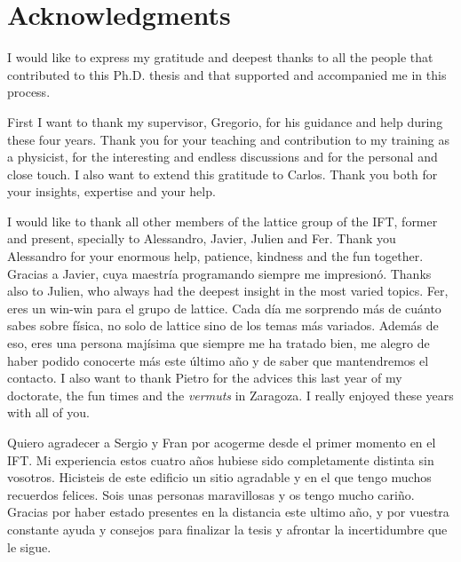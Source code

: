 
\bigskip

\begingroup
\let\clearpage\relax
\let\cleardoublepage\relax
\let\cleardoublepage\relax
\chapter*{Acknowledgments}

I would like to express my gratitude and deepest thanks to all the people that contributed to this Ph.D. thesis and that supported and accompanied me in this process.

First I want to thank my supervisor, Gregorio, for his guidance and help during these four years. Thank you for your teaching and contribution to my training as a physicist, for the interesting and endless discussions and for the personal and close touch. I also want to extend this gratitude to Carlos. Thank you both for your insights, expertise and your help.

I would like to thank all other members of the lattice group of the IFT, former and present, specially to Alessandro, Javier, Julien and Fer. Thank you Alessandro for your enormous help, patience, kindness and the fun together. Gracias a Javier, cuya maestría programando siempre me impresionó. Thanks also to Julien, who always had the deepest insight in the most varied topics. Fer, eres un win-win para el grupo de lattice. Cada día me sorprendo más de cuánto sabes sobre física, no solo de lattice sino de los temas más variados. Además de eso, eres una persona majísima que siempre me ha tratado bien, me alegro de haber podido conocerte más este último año y de saber que mantendremos el contacto. I also want to thank Pietro for the advices this last year of my doctorate, the fun times and the \textit{vermuts} in Zaragoza. I really enjoyed these years with all of you.

Quiero agradecer a Sergio y Fran por acogerme desde el primer momento en el IFT. Mi experiencia estos cuatro años hubiese sido completamente distinta sin vosotros. Hicisteis de este edificio un sitio agradable y en el que tengo muchos recuerdos felices. Sois unas personas maravillosas y os tengo mucho cariño. Gracias por haber estado presentes en la distancia este ultimo año, y por vuestra constante ayuda y consejos para finalizar la tesis y afrontar la incertidumbre que le sigue.

